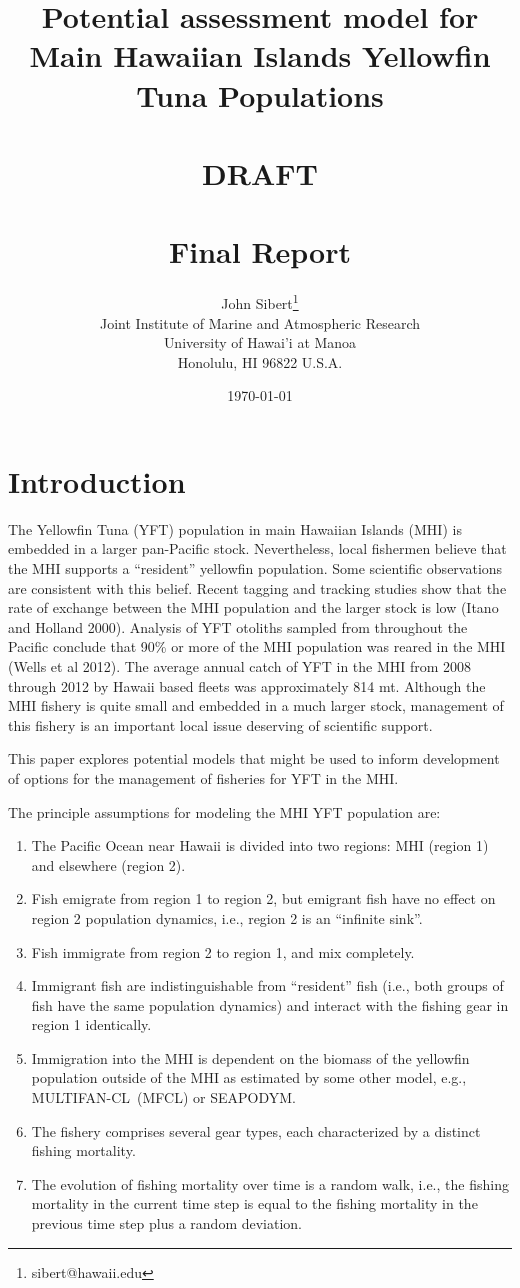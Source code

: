 \documentclass[12pt,letterpaper]{article}
\title{Potential assessment model for Main Hawaiian Islands Yellowfin Tuna
Populations\\
~\\
\color{red}DRAFT\normalcolor\\
~\\
Final Report}
\author{
John Sibert\thanks{sibert@hawaii.edu}\\
Joint Institute of Marine and Atmospheric Research\\
University of Hawai'i at Manoa\\
Honolulu, HI  96822 U.S.A.\\[0.125in]
\date{\today}
}
\newcommand\doublespacing{\baselineskip=1.6\normalbaselineskip}
\newcommand\SD{SEAPODYM}
\newcommand\MFCL{MULTIFAN-CL}
\begin{document}
\maketitle

\doublespacing

\section*{Introduction}
The Yellowfin Tuna (YFT) population in main Hawaiian Islands (MHI) is
embedded in a larger pan-Pacific stock. Nevertheless, local fishermen
believe that the MHI supports a ``resident'' yellowfin population.
Some scientific observations are consistent with this belief. 
Recent tagging and tracking
studies show that the rate of exchange between the MHI population
and the larger stock is low (Itano and Holland 2000). Analysis
of YFT otoliths sampled from
throughout the Pacific conclude that 90\% or more of the MHI
population was reared in the MHI (Wells et al 2012).
The average annual catch of YFT in the MHI from 2008 through 2012 by Hawaii
based fleets was approximately 814 mt. 
Although the MHI fishery is quite small and embedded in a much larger
stock, management of this
fishery is an important local issue deserving of scientific support.

This paper explores potential models that might be used to
inform development of options for the management of fisheries for YFT
in the MHI.

The principle assumptions for modeling the MHI YFT population are:
\begin{enumerate}
\item The Pacific Ocean near Hawaii is divided into two regions:
MHI (region 1) and elsewhere (region 2).%
\item Fish emigrate from region 1 to region 2, but emigrant fish have
no effect on region 2 population dynamics, i.e., region 2 is an ``infinite
sink''.
\item Fish immigrate from region 2 to region 1, and mix completely.
\item Immigrant fish are indistinguishable from ``resident'' fish
(i.e., both groups of fish have the same population dynamics) and
interact with the fishing gear in region 1 identically.
\item Immigration into the MHI is dependent on the
biomass of the yellowfin population outside of the MHI as estimated by
some other model, e.g., \MFCL\ (MFCL) or \SD.
\item The fishery comprises several gear types, each characterized by 
a distinct fishing mortality.
\item The evolution of fishing mortality over time is a random walk,
i.e., the fishing mortality in the current time step is equal
to the fishing mortality in the previous time step plus a random
deviation.
\end{enumerate}
\end{document}
